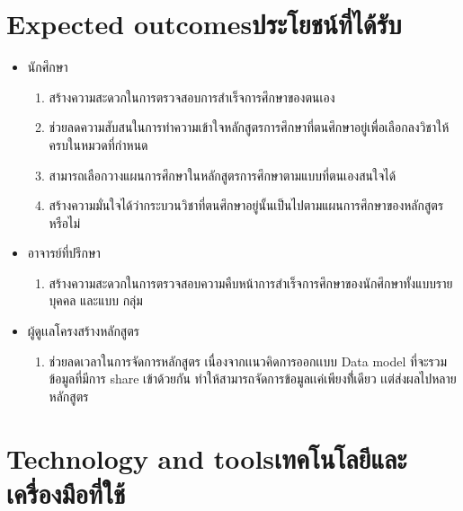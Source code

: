\section{\ifenglish Expected outcomes\else ประโยชน์ที่ได้รับ\fi}
\begin{itemize}
    \item นักศึกษา
    \begin{enumerate}
        \item สร้างความสะดวกในการตรวจสอบการสําเร็จการศึกษาของตนเอง
        \item ช่วยลดความสับสนในการทําความเข้าใจหลักสูตรการศึกษาที่ตนศึกษาอยู่เพื่อเลือกลงวิชาให้ครบในหมวดที่กําหนด
        \item สามารถเลือกวางแผนการศึกษาในหลักสูตรการศึกษาตามแบบที่ตนเองสนใจได้
        \item สร้างความมั่นใจได้ว่ากระบวนวิชาที่ตนศึกษาอยู่นั้นเป็นไปตามแผนการศึกษาของหลักสูตรหรือไม่
    \end{enumerate}
    \item อาจารย์ที่ปรึกษา
    \begin{enumerate}
        \item สร้างความสะดวกในการตรวจสอบความคืบหน้าการสําเร็จการศึกษาของนักศึกษาทั้งแบบรายบุคคล และแบบ
        กลุ่ม
        
    \end{enumerate}
    \item ผู้ดูเเลโครงสร้างหลักสูตร
    \begin{enumerate}
        \item ช่วยลดเวลาในการจัดการหลักสูตร เนื่องจากเเนวคิดการออกเเบบ Data model 
        ที่จะรวมข้อมูลที่มีการ share เข้าด้วยกัน ทําให้สามารถจัดการข้อมูลเเค่เพียงที่้เดียว เเต่ส่งผลไปหลายหลักสูตร
    \end{enumerate}
\end{itemize}

\section{\ifenglish Technology and tools\else เทคโนโลยีและเครื่องมือที่ใช้\fi}


